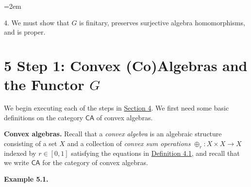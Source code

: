 \documentclass[11pt,a4paper]{amsart}
\begin{document}
\begin{list}{}{\leftmargin=2em}
\hypertarget{html:S4.I1.i4}{}
\item[]  4. %
\hypertarget{html:S4.I1.i4.p1}{} We must show that %
\hypertarget{html:S4.I1.i4.p1.m1}{}\({G}\) is finitary, preserves surjective algebra homomorphisms, and is proper.
\par\medskip
  
 
\end{list}
   
%
\hypertarget{html:S5}{} %
\hypertarget{html:S5.m1}{}\section*{5 Step 1: Convex (Co)Algebras and the Functor \({G}\)}
\hypertarget{html:S5.p1}{} We begin executing each of the steps in \hyperlink{html:S4}{Section 4}. We first need some basic definitions on the category %
\hypertarget{html:S5.p1.m1}{}\({\mathsf{CA}}\) of convex algebras.
\par\medskip
\hypertarget{html:S5.SS0.SSS0.P0.SPx1}{} \par\noindent\textbf{Convex algebras.}\quad  %
\hypertarget{html:S5.SS0.SSS0.P0.SPx1.p1}{} Recall that a \emph{convex algebra} is an algebraic structure consisting of a set %
\hypertarget{html:S5.SS0.SSS0.P0.SPx1.p1.m1}{}\({X}\) and a collection of \emph{convex sum operations} %
\hypertarget{html:S5.SS0.SSS0.P0.SPx1.p1.m2}{}\({\oplus_{r}\colon X\times X\to X}\) indexed by %
\hypertarget{html:S5.SS0.SSS0.P0.SPx1.p1.m3}{}\({r\in[0,1]}\) satisfying the equations in \hyperlink{html:S4.Thmtheorem1}{Definition 4.1}, and recall that we write %
\hypertarget{html:S5.SS0.SSS0.P0.SPx1.p1.m4}{}\({\mathsf{CA}}\) for the category of convex algebras.
\par\medskip
\hypertarget{html:S5.Thmtheorem1}{} \par\noindent\textbf{\textbf{Example 5.1}\textbf{.}}\quad  %
\end{document}
